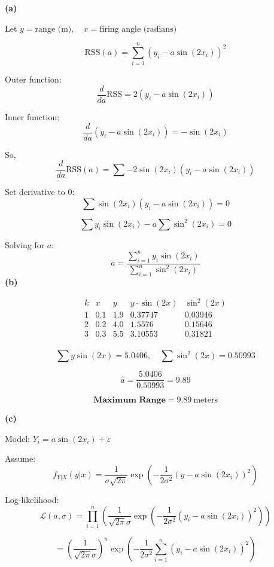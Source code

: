 \documentclass[12pt]{article}
\begin{document}
\vspace{1em}
\noindent\textbf{(a)}\

Let \( y = \text{range (m)}, \quad x = \text{firing angle (radians)} \)

\[
\text{RSS}(a) = \sum_{i=1}^n \left( y_i - a \sin(2x_i) \right)^2
\]

Outer function:
\[
\frac{d}{da} \text{RSS} = 2(y_i - a \sin(2x_i))
\]

Inner function:
\[
\frac{d}{da}(y_i - a \sin(2x_i)) = -\sin(2x_i)
\]

So,
\[
\frac{d}{da} \text{RSS}(a) = \sum -2 \sin(2x_i) \left( y_i - a \sin(2x_i) \right)
\]

Set derivative to 0:
\[
\sum \sin(2x_i) \left( y_i - a \sin(2x_i) \right) = 0
\]

\[
\sum y_i \sin(2x_i) - a \sum \sin^2(2x_i) = 0
\]

Solving for \( a \):
\[
\hat{a} = \frac{\sum_{i=1}^n y_i \sin(2x_i)}{\sum_{i=1}^n \sin^2(2x_i)}
\]
\vspace{1em}
\noindent\textbf{(b)}\

\[
\begin{array}{cccccc}
k & x & y & y \cdot \sin(2x) & \sin^2(2x) \\
1 & 0.1 & 1.9 & 0.37747 & 0.03946 \\
2 & 0.2 & 4.0 & 1.5576 & 0.15646 \\
3 & 0.3 & 5.5 & 3.10553 & 0.31821 \\
\end{array}
\]

\[
\sum y \sin(2x) = 5.0406, \quad \sum \sin^2(2x) = 0.50993
\]

\[
\boxed{\hat{a} = \frac{5.0406}{0.50993} = 9.89}
\]

\[
\boxed{\textbf{Maximum Range} = 9.89\ \text{meters}}
\]


\vspace{1em}
\noindent\textbf{(c)}\

Model: \( Y_i = a \sin(2x_i) + \varepsilon \)

Assume:
\[
f_{Y|X}(y|x) = \frac{1}{\sigma \sqrt{2\pi}} \exp \left( -\frac{1}{2\sigma^2}(y - a \sin(2x_i))^2 \right)
\]

Log-likelihood:
\[
\mathcal{L}(a, \sigma) = \prod_{i=1}^{n} \left( \frac{1}{\sqrt{2\pi} \sigma} \exp \left( -\frac{1}{2\sigma^2} (y_i - a \sin(2x_i))^2 \right) \right)
\]

\[
= \left( \frac{1}{\sqrt{2\pi} \sigma} \right)^n \exp \left( -\frac{1}{2\sigma^2} \sum_{i=1}^{n} (y_i - a \sin(2x_i))^2 \right)
\]
\end{document}

